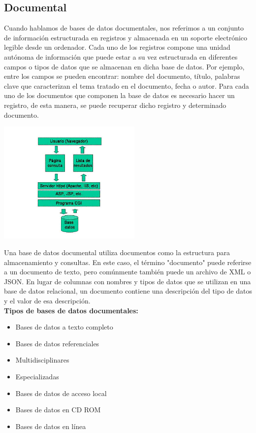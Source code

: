 \documentclass[twoside,twocolumn]{article}
\begin{document}
\subsection{Documental}
Cuando hablamos de bases de datos documentales, nos referimos a un conjunto de información estructurada en registros y almacenada en un soporte electrónico legible desde un ordenador. Cada uno de los registros compone una unidad autónoma de información que puede estar a su vez estructurada en diferentes campos o tipos de datos que se almacenan en dicha base de datos. Por ejemplo, entre los campos se pueden encontrar: nombre del documento, título, palabras clave que caracterizan el tema tratado en el documento, fecha o autor. Para cada uno de los documentos que componen la base de datos es necesario hacer un registro, de esta manera, se puede recuperar dicho registro y determinado documento.

\begin{center}
	\includegraphics[width=7cm]{./Imagenes/documental} 
\end{center}


Una base de datos documental utiliza documentos como la estructura para almacenamiento y consultas. En este caso, el término "documento" puede referirse a un documento de texto, pero comúnmente también puede un archivo de XML o JSON. En lugar de columnas con nombres y tipos de datos que se utilizan en una base de datos relacional, un documento contiene una descripción del tipo de datos y el valor de esa descripción.
\\
	\textbf{Tipos de bases de datos documentales:}
\begin{itemize}	

	\item Bases de datos a texto completo
	\item Bases de datos referenciales
	\item Multidisciplinares
	\item Especializadas
	\item Bases de datos de acceso local
	\item Bases de datos en CD ROM
\item Bases de datos en línea
\end{itemize} 
\end{document}
